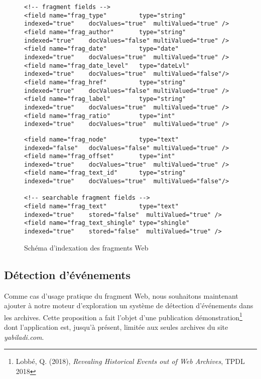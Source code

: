 \documentclass[symmetric,justified,marginals=raggedouter]{tufte-book}
\begin{document}
\begin{figure*}
\begin{verbatim}
<!-- fragment fields -->
<field name="frag_type"         type="string"  indexed="true"    docValues="true"  multiValued="true" />    
<field name="frag_author"       type="string"  indexed="true"    docValues="false" multiValued="true" />
<field name="frag_date"         type="date"    indexed="true"    docValues="true"  multiValued="true" />
<field name="frag_date_level"   type="dateLvl" indexed="true"    docValues="true"  multiValued="false"/> 
<field name="frag_href"         type="string"  indexed="true"    docValues="false" multiValued="true" />
<field name="frag_label"        type="string"  indexed="true"    docValues="true"  multiValued="true" />
<field name="frag_ratio"        type="int"     indexed="true"    docValues="true"  multiValued="true" />
\end{verbatim} 
\end{figure*}

\newpage

\begin{figure*}
\small
\begin{verbatim}
<field name="frag_node"         type="text"    indexed="false"   docValues="false" multiValued="true" />  
<field name="frag_offset"       type="int"     indexed="true"    docValues="true"  multiValued="true" />
<field name="frag_text_id"      type="string"  indexed="true"    docValues="true"  multiValued="false"/>

<!-- searchable fragment fields -->
<field name="frag_text"         type="text"    indexed="true"    stored="false"  multiValued="true" />
<field name="frag_text_shingle" type="shingle" indexed="true"    stored="false"  multiValued="true" />   
\end{verbatim} 
\caption{Schéma d'indexation des fragments Web}
\label{fig:schema_2}
\end{figure*}

\subsection{Détection d'événements}

\noindent Comme cas d'usage pratique du fragment Web, nous souhaitons maintenant ajouter à notre moteur d'exploration un système de détection d'événements dans les archives. Cette proposition a fait l'objet d'une publication démonstration\footnote{\RaggedOuter Lobbé, Q. (2018), \textit{Revealing Historical Events out of Web Archives}, TPDL 2018} dont l'application est, jusqu'à présent, limitée aux seules archives du site \textit{yabiladi.com}. 
\end{document}
